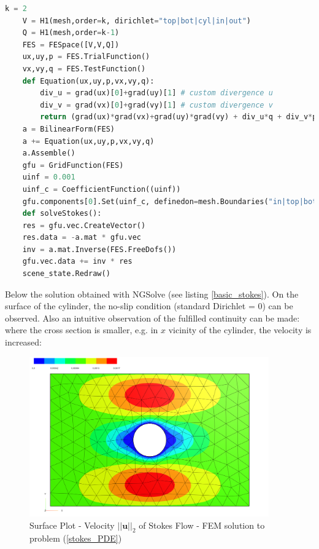 \pagebreak

\begin{lstlisting}[language=Python, title=Basic Stokes PDE's with NGSolve in Python, label=basic_stokes]
    k = 2
    V = H1(mesh,order=k, dirichlet="top|bot|cyl|in|out")
    Q = H1(mesh,order=k-1)
    FES = FESpace([V,V,Q])
    ux,uy,p = FES.TrialFunction()
    vx,vy,q = FES.TestFunction()
    def Equation(ux,uy,p,vx,vy,q):
        div_u = grad(ux)[0]+grad(uy)[1] # custom divergence u
        div_v = grad(vx)[0]+grad(vy)[1] # custom divergence v
        return (grad(ux)*grad(vx)+grad(uy)*grad(vy) + div_u*q + div_v*p)* dx
    a = BilinearForm(FES)
    a += Equation(ux,uy,p,vx,vy,q)
    a.Assemble()
    gfu = GridFunction(FES)
    uinf = 0.001
    uinf_c = CoefficientFunction((uinf))
    gfu.components[0].Set(uinf_c, definedon=mesh.Boundaries("in|top|bot|out"))
    def solveStokes():
    res = gfu.vec.CreateVector()
    res.data = -a.mat * gfu.vec
    inv = a.mat.Inverse(FES.FreeDofs())
    gfu.vec.data += inv * res
    scene_state.Redraw()
\end{lstlisting}

Below the solution obtained with NGSolve (see listing \ref{basic_stokes}). On the surface of the cylinder, 
the no-slip condition (standard Dirichlet = 0) can be observed. Also an intuitive observation of the fulfilled continuity can be made:
where the cross section is smaller, e.g. in $x$ vicinity of the cylinder, the velocity is increased:

\begin{figure}[ht]
    \centering
    \includegraphics[width=0.92\textwidth]{figures/solution_stokes_basic.PNG}
	\caption{Surface Plot - Velocity $||\mathbf{u}||_2$ of Stokes Flow - FEM solution to problem (\ref{stokes_PDE})}
	\label{basic_stokes_flow_plot}
\end{figure}